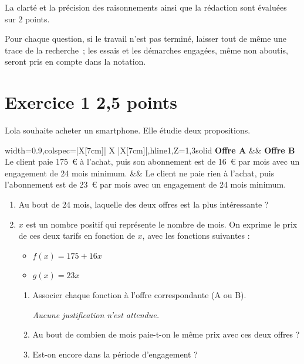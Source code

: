 \documentclass[12pt,a4paper,french]{article}
\begin{document}
La clarté et la précision des raisonnements ainsi que la rédaction sont évaluées sur 2 points.

Pour chaque question, si le travail n'est pas terminé, laisser tout de même une trace de la recherche~; les essais et les démarches engagées, même non aboutis, seront pris en compte dans la notation.

\medskip

\section*{Exercice 1 \hfill 2,5 points}

Lola souhaite acheter un smartphone. Elle étudie deux propositions.

\begin{center}
	\begin{tblr}{width=0.9\linewidth,colspec={|X[7cm]| X |X[7cm]|},hline{1,Z}={1,3}{solid}}
		\textbf{Offre A} && \textbf{Offre B} \\
		Le client paie 175~\euro{} à l'achat, puis son abonnement est de 16~\euro{} par mois avec un engagement de 24 mois minimum. &&
		Le client ne paie rien à l'achat, puis l'abonnement est de 23~\euro{} par mois avec un engagement de 24 mois minimum.
	\end{tblr}
\end{center}

\begin{enumerate}
	\item Au bout de 24 mois, laquelle des deux offres est la plus intéressante ?
	\item $x$ est un nombre positif qui représente le nombre de mois. On exprime le prix de ces deux tarifs en fonction de $x$, avec les fonctions suivantes :

	\begin{itemize}
		\item $f(x) = 175 + 16x$
		\item $g(x) = 23x$
	\end{itemize}

	\begin{enumerate}[label={\textbf{\alph*.}}]
		\item Associer chaque fonction à l'offre correspondante (A ou B).

		\emph{Aucune justification n'est attendue.}
		\item Au bout de combien de mois paie-t-on le même prix avec ces deux offres ?
		\item Est-on encore dans la période d'engagement ?
	\end{enumerate}
\end{enumerate}
\end{document}
